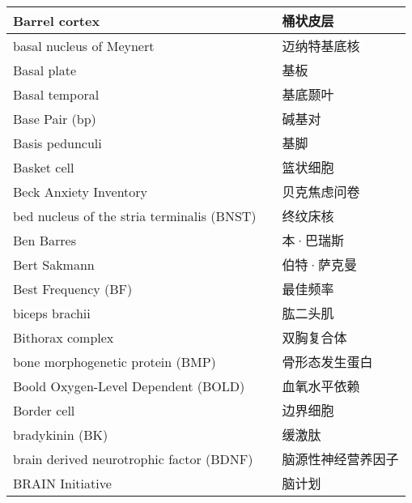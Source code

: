 \begin{longtable}{lll}
	\midrule
	Barrel cortex   && 桶状皮层  \\
	
	\midrule
	basal nucleus of Meynert   && 迈纳特基底核  \\
	
	\midrule
	Basal plate   && 基板  \\
	
	\midrule
	Basal temporal   && 基底颞叶  \\
	
	\midrule
	Base Pair (bp)  && 碱基对  \\
	
	\midrule
	Basis pedunculi   && 基脚  \\
	
	\midrule
	Basket cell   && 篮状细胞  \\
	
	\midrule
	Beck Anxiety Inventory   && 贝克焦虑问卷  \\
	
	\midrule
	bed nucleus of the stria terminalis (BNST)  && 终纹床核  \\
	
	\midrule
	Ben Barres   && 本·巴瑞斯  \\
	
	\midrule
	Bert Sakmann   && 伯特·萨克曼  \\
 
	\midrule
	Best Frequency (BF)     && 最佳频率   \\
	
	\midrule
	biceps brachii     && 	肱二头肌   \\
	
	\midrule
	Bithorax complex     && 	双胸复合体   \\
	
	\midrule
	bone morphogenetic protein  (BMP)   && 	骨形态发生蛋白   \\
 
	\midrule
	Boold Oxygen-Level Dependent (BOLD)     && 血氧水平依赖   \\
	
	\midrule
	Border cell     && 边界细胞   \\
	
	\midrule
	bradykinin (BK)     && 缓激肽   \\
	
	\midrule
	brain derived neurotrophic factor (BDNF)     && 脑源性神经营养因子   \\
	
	\midrule
	BRAIN Initiative     && 脑计划   \\
	

\end{longtable}
